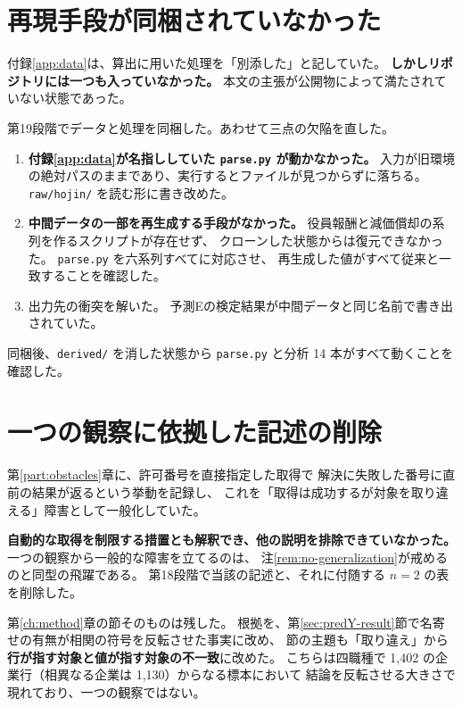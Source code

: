 \section{再現手段が同梱されていなかった}

付録\ref{app:data}は、算出に用いた処理を「別添した」と記していた。
\textbf{しかしリポジトリには一つも入っていなかった。}
本文の主張が公開物によって満たされていない状態であった。

第19段階でデータと処理を同梱した。あわせて三点の欠陥を直した。

\begin{enumerate}[label=(\arabic*)]
\item \textbf{付録\ref{app:data}が名指ししていた \texttt{parse.py} が動かなかった。}
入力が旧環境の絶対パスのままであり、実行するとファイルが見つからずに落ちる。
\texttt{raw/hojin/} を読む形に書き改めた。

\item \textbf{中間データの一部を再生成する手段がなかった。}
役員報酬と減価償却の系列を作るスクリプトが存在せず、
クローンした状態からは復元できなかった。
\texttt{parse.py} を六系列すべてに対応させ、
再生成した値がすべて従来と一致することを確認した。

\item 出力先の衝突を解いた。
予測Eの検定結果が中間データと同じ名前で書き出されていた。
\end{enumerate}

同梱後、\texttt{derived/} を消した状態から
\texttt{parse.py} と分析 14 本がすべて動くことを確認した。

\section{一つの観察に依拠した記述の削除}

第\ref{part:obstacles}章に、許可番号を直接指定した取得で
解決に失敗した番号に直前の結果が返るという挙動を記録し、
これを「取得は成功するが対象を取り違える」障害として一般化していた。

\textbf{自動的な取得を制限する措置とも解釈でき、他の説明を排除できていなかった。}
一つの観察から一般的な障害を立てるのは、
注\ref{rem:no-generalization}が戒めるのと同型の飛躍である。
第18段階で当該の記述と、それに付随する $n=2$ の表を削除した。

第\ref{ch:method}章の節そのものは残した。
根拠を、第\ref{sec:predY-result}節で名寄せの有無が相関の符号を反転させた事実に改め、
節の主題も「取り違え」から\textbf{行が指す対象と値が指す対象の不一致}に改めた。
こちらは四職種で 1,402 の企業行（相異なる企業は 1,130）からなる標本において
結論を反転させる大きさで現れており、一つの観察ではない。

